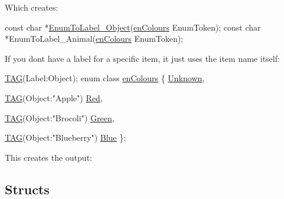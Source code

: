 Which creates\+: 
\begin{DoxyCode}
\textcolor{keyword}{const} \textcolor{keywordtype}{char} *\hyperlink{Generated__Test_8h_a9b8638e967a81b3c211b77df49d85034}{EnumToLabel\_Object}(\hyperlink{PreprocTest_8h_a081cf1a0e70d6e2bd48c98f457742877}{enColours} EnumToken);
\textcolor{keyword}{const} \textcolor{keywordtype}{char} *EnumToLabel\_Animal(\hyperlink{PreprocTest_8h_a081cf1a0e70d6e2bd48c98f457742877}{enColours} EnumToken);
\end{DoxyCode}


If you don\textquotesingle{}t have a label for a specific item, it just uses the item name itself\+:


\begin{DoxyCode}
\hyperlink{Generated__001_8h_ad9b15e5b6d9b1ed55b76d9916ff6dec2}{TAG}(Label:Object);
\textcolor{keyword}{enum class} \hyperlink{PreprocTest_8h_a081cf1a0e70d6e2bd48c98f457742877}{enColours}
\{
    \hyperlink{ab__file_8h_a1b665fc63cb310d53283fbcd1b19746ea88183b946cc5f0e8c96b2e66e1c74a7e}{Unknown}, 

    \hyperlink{ParsedC_8h_a542930d5f2f117ff1e21206f2baa51c5ae444f73956e5b2a401eb9471db89e7c9}{TAG}(Object:\textcolor{stringliteral}{"Apple"})
    \hyperlink{PreprocTest_8h_a081cf1a0e70d6e2bd48c98f457742877aee38e4d5dd68c4e440825018d549cb47}{Red},

    \hyperlink{ParsedC_8h_a542930d5f2f117ff1e21206f2baa51c5ae444f73956e5b2a401eb9471db89e7c9}{TAG}(Object:\textcolor{stringliteral}{"Brocoli"})
    \hyperlink{PreprocTest_8h_a081cf1a0e70d6e2bd48c98f457742877ad382816a3cbeed082c9e216e7392eed1}{Green},

    \hyperlink{ParsedC_8h_a542930d5f2f117ff1e21206f2baa51c5ae444f73956e5b2a401eb9471db89e7c9}{TAG}(Object:\textcolor{stringliteral}{"Blueberry"})
    \hyperlink{PreprocTest_8h_a081cf1a0e70d6e2bd48c98f457742877a9594eec95be70e7b1710f730fdda33d9}{Blue}
\};
\end{DoxyCode}


This creates the output\+: 


\subsection*{Structs}

